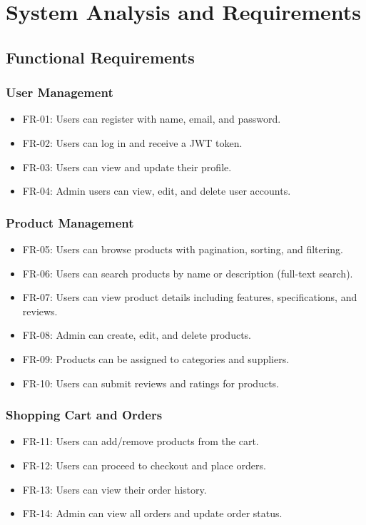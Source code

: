 \documentclass[12pt,a4paper]{report}
\begin{document}
\chapter{System Analysis and Requirements}

\section{Functional Requirements}

\subsection{User Management}
\begin{itemize}[noitemsep]
  \item FR-01: Users can register with name, email, and password.
  \item FR-02: Users can log in and receive a JWT token.
  \item FR-03: Users can view and update their profile.
  \item FR-04: Admin users can view, edit, and delete user accounts.
\end{itemize}

\subsection{Product Management}
\begin{itemize}[noitemsep]
  \item FR-05: Users can browse products with pagination, sorting, and filtering.
  \item FR-06: Users can search products by name or description (full-text search).
  \item FR-07: Users can view product details including features, specifications, and reviews.
  \item FR-08: Admin can create, edit, and delete products.
  \item FR-09: Products can be assigned to categories and suppliers.
  \item FR-10: Users can submit reviews and ratings for products.
\end{itemize}

\subsection{Shopping Cart and Orders}
\begin{itemize}[noitemsep]
  \item FR-11: Users can add/remove products from the cart.
  \item FR-12: Users can proceed to checkout and place orders.
  \item FR-13: Users can view their order history.
  \item FR-14: Admin can view all orders and update order status.
\end{itemize}
\end{document}
